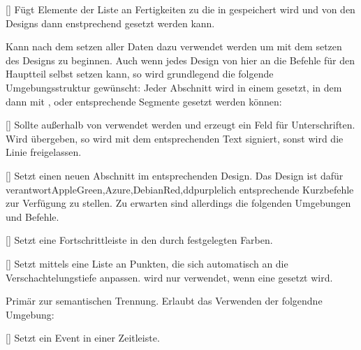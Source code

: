 %
%
%

[\cmdlist{}]
Fügt Elemente der Liste an Fertigkeiten zu die in  gespeichert wird und von den Designs dann enstprechend gesetzt werden kann.

%
%
%

Kann nach dem setzen aller Daten dazu verwendet werden um mit dem setzen des Designs zu beginnen. Auch wenn jedes Design von hier an die Befehle für den Hauptteil selbst setzen kann, so wird grundlegend die folgende Umgebungsstruktur gewünscht: Jeder Abschnitt wird in einem  gesetzt, in dem dann mit ,  oder  entsprechende Segmente gesetzt werden können:

%
%
%

[]
Sollte außerhalb von  verwendet werden und erzeugt ein Feld für Unterschriften. Wird  übergeben, so wird mit dem entsprechenden Text signiert, sonst wird die Linie freigelassen.

%
%
%

[]
Setzt einen neuen Abschnitt im entsprechenden Design. Das Design ist dafür verantwortAppleGreen,Azure,DebianRed,ddpurplelich entsprechende Kurzbefehle zur Verfügung zu stellen. Zu erwarten sind allerdings die folgenden Umgebungen und Befehle.

%
%
%

[]
Setzt eine Fortschrittleiste in den durch  festgelegten Farben.

%
%
%

[]
Setzt mittels  eine Liste an Punkten, die sich automatisch an die Verschachtelungstiefe anpassen.  wird nur verwendet, wenn eine  gesetzt wird.

%
%
%

Primär zur semantischen Trennung. Erlaubt das Verwenden der folgendne Umgebung:

%
%
%

[]
Setzt ein Event in einer Zeitleiste.

